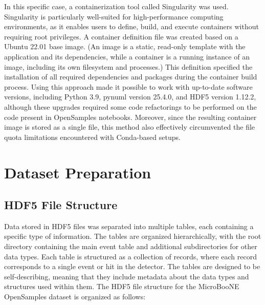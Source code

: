 \documentclass{pracalicmgr}
\begin{document}
In this specific case, a containerization tool called Singularity was used. Singularity is particularly well-suited for high-performance computing environments, as it enables users to define, build, and execute containers without requiring root privileges. A container definition file was created based on a Ubuntu 22.01 base image. (An image is a static, read-only template with the application and its dependencies, while a container is a running instance of an image, including its own filesystem and processes.) This definition specified the installation of all required dependencies and packages during the container build process. Using this approach made it possible to work with up-to-date software versions, including Python 3.9, pynuml version 25.4.0, and HDF5 version 1.12.2, although these upgrades required some code refactorings to be performed on the code present in OpenSamples notebooks. Moreover, since the resulting container image is stored as a single file, this method also effectively circumvented the file quota limitations encountered with Conda-based setups.

\section{Dataset Preparation}

\subsection{HDF5 File Structure}

Data stored in HDF5 files was separated into multiple tables, each containing a specific type of information. The tables are organized hierarchically, with the root directory containing the main event table and additional subdirectories for other data types. Each table is structured as a collection of records, where each record corresponds to a single event or hit in the detector. The tables are designed to be self-describing, meaning that they include metadata about the data types and structures used within them.
The HDF5 file structure for the MicroBooNE OpenSamples dataset is organized as follows:
\end{document}
